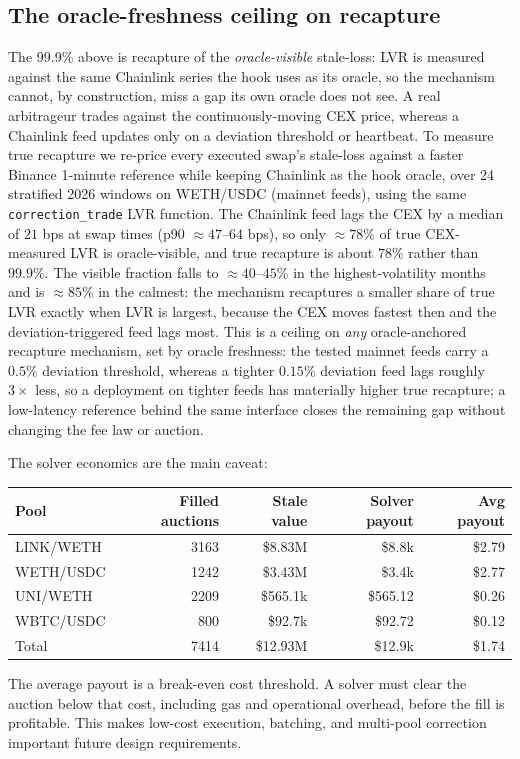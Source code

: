 \documentclass[11pt]{article}
\begin{document}
\subsection{The oracle-freshness ceiling on recapture}
The 99.9\% above is recapture of the \emph{oracle-visible} stale-loss: LVR is measured against the same Chainlink series the hook uses as its oracle, so the mechanism cannot, by construction, miss a gap its own oracle does not see. A real arbitrageur trades against the continuously-moving CEX price, whereas a Chainlink feed updates only on a deviation threshold or heartbeat. To measure true recapture we re-price every executed swap's stale-loss against a faster Binance 1-minute reference while keeping Chainlink as the hook oracle, over 24 stratified 2026 windows on WETH/USDC (mainnet feeds), using the same \texttt{correction\_trade} LVR function. The Chainlink feed lags the CEX by a median of $21$ bps at swap times (p90 $\approx 47$--$64$ bps), so only $\approx 78\%$ of true CEX-measured LVR is oracle-visible, and true recapture is about $78\%$ rather than $99.9\%$. The visible fraction falls to $\approx 40$--$45\%$ in the highest-volatility months and is $\approx 85\%$ in the calmest: the mechanism recaptures a smaller share of true LVR exactly when LVR is largest, because the CEX moves fastest then and the deviation-triggered feed lags most. This is a ceiling on \emph{any} oracle-anchored recapture mechanism, set by oracle freshness: the tested mainnet feeds carry a $0.5\%$ deviation threshold, whereas a tighter $0.15\%$ deviation feed lags roughly $3\times$ less, so a deployment on tighter feeds has materially higher true recapture; a low-latency reference behind the same interface closes the remaining gap without changing the fee law or auction.

The solver economics are the main caveat:
\begin{center}
\begin{tabular}{lrrrr}
\toprule
Pool & Filled auctions & Stale value & Solver payout & Avg payout \\
\midrule
LINK/WETH & 3163 & \$8.83M & \$8.8k & \$2.79 \\
WETH/USDC & 1242 & \$3.43M & \$3.4k & \$2.77 \\
UNI/WETH & 2209 & \$565.1k & \$565.12 & \$0.26 \\
WBTC/USDC & 800 & \$92.7k & \$92.72 & \$0.12 \\
\midrule
Total & 7414 & \$12.93M & \$12.9k & \$1.74 \\
\bottomrule
\end{tabular}
\end{center}
The average payout is a break-even cost threshold. A solver must clear the auction below that cost, including gas and operational overhead, before the fill is profitable. This makes low-cost execution, batching, and multi-pool correction important future design requirements.
\end{document}
